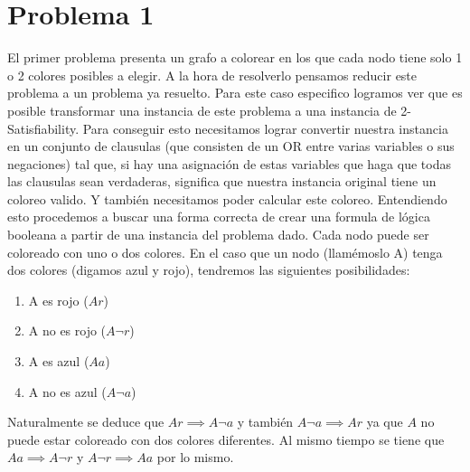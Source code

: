 \documentclass{article}
\theoremstyle{definition}
\theoremstyle{remark}
\begin{document}
{} %

\subtitulo{}
\grupo{}

 
\maketitle

\pagebreak

\tableofcontents

\pagebreak

\section{Problema 1}

El primer problema presenta un grafo a colorear en los que cada nodo tiene solo 1 o 2 colores posibles a elegir. A la hora de resolverlo pensamos reducir este problema a un problema ya resuelto. Para este caso especifico logramos ver que es posible transformar una instancia de este problema a una instancia de 2-Satisfiability.
Para conseguir esto necesitamos lograr convertir nuestra instancia en un conjunto de clausulas (que consisten de un OR entre varias variables o sus negaciones) tal que, si hay una asignación de estas variables que haga que todas las clausulas sean verdaderas, significa que nuestra instancia original tiene un coloreo valido. Y también necesitamos poder calcular este coloreo.
Entendiendo esto procedemos a buscar una forma correcta de crear una formula de lógica booleana a partir de una instancia del problema dado.
Cada nodo puede ser coloreado con uno o dos colores. 
En el caso que un nodo (llamémoslo A) tenga dos colores (digamos azul y rojo), tendremos las siguientes posibilidades:
\begin{enumerate}
\item A es rojo ($Ar$)
\item A no es rojo ($A\neg r$)
\item A es azul ($Aa$)
\item A no es azul ($A\neg a$)
\end{enumerate}
Naturalmente se deduce que $Ar \implies A\neg a$ y también $A\neg a \implies Ar$ ya que $A$ no puede estar coloreado con dos colores diferentes. Al mismo tiempo se tiene que $Aa \implies A\neg r$ y $A\neg r \implies Aa$ por lo mismo.
\end{document}
